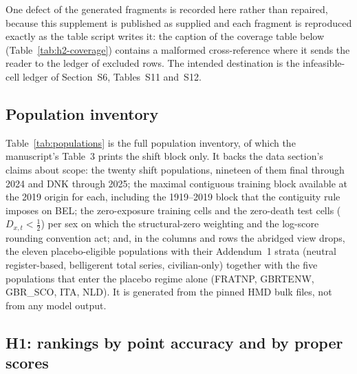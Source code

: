 One defect of the generated fragments is recorded here rather than repaired,
because this supplement is published as supplied and each fragment is
reproduced exactly as the table script writes it: the caption of the coverage
table below (Table~\ref{tab:h2-coverage}) contains a malformed cross-reference
where it sends the reader to the ledger of excluded rows. The intended
destination is the infeasible-cell ledger of Section~S6, Tables~S11 and~S12.

\subsection{Population inventory}

Table~\ref{tab:populations} is the full population inventory, of which the
manuscript's Table~3 prints the shift block only. It backs the data section's
claims about scope: the twenty shift populations, nineteen of them final
through 2024 and DNK through 2025; the maximal contiguous training block
available at the 2019 origin for each, including the 1919--2019 block that the
contiguity rule imposes on BEL; the zero-exposure training cells and the
zero-death test cells ($D_{x,t} < \tfrac{1}{2}$) per sex on which the
structural-zero weighting and the log-score rounding convention act; and, in
the columns and rows the abridged view drops, the eleven placebo-eligible
populations with their Addendum~1 strata (neutral register-based, belligerent
total series, civilian-only) together with the five populations that enter the
placebo regime alone (FRATNP, GBRTENW, GBR\_SCO, ITA, NLD). It is generated
from the pinned HMD bulk files, not from any model output.

\begin{table}[htbp]\centering
\caption{Populations by regime: first and last year of single-age data in the
pinned vintage, training years available at the shift origin, zero-exposure
cells at ages $0$--$99$, and zero-death test cells ($D<\tfrac{1}{2}$) per sex
in the shift window, with placebo eligibility and Addendum~1 stratum.
Generated from the data files, not from any model output. The manuscript's
Table~3 is the shift block of this table.}
\label{tab:populations}
\end{table}

\subsection{H1: rankings by point accuracy and by proper scores}


